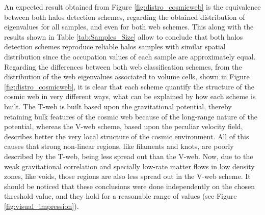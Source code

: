 \documentclass[a4,useAMS,usenatbib,usegraphicx]{latex/mn2e}
\begin{document}
An expected result obtained from Figure \ref{fig:distro_cosmicweb} is 
the equivalence between both halos detection schemes, regarding the 
obtained distribution of eigenvalues for all samples, and even for both 
web schemes. This along with the results shown in Table 
\ref{tab:Samples_Size} allow to conclude that both halos detection schemes 
reproduce reliable halos samples with similar spatial distribution since 
the occupation values of each sample are approximately equal. Regarding 
the differences between both web classification schemes, from the 
distribution of the web eigenvalues associated to volume cells, shown in 
Figure \ref{fig:distro_cosmicweb}, it is clear that each scheme quantify 
the structure of the cosmic web in very different ways, what can be 
explained by how each scheme is built. The T-web is built based upon the 
gravitational potential, thereby retaining bulk features of the cosmic web 
because of the long-range nature of the potential, whereas the V-web 
scheme, based upon the peculiar velocity field, describes better the very 
local structure of the cosmic environment. All of this causes that
strong non-linear regions, like filaments and knots, are poorly described 
by the T-web, being less spread out than the V-web. Now, due to the weak 
gravitational correlation and specially low-rate matter flows in low 
density zones, like voids, those regions are also less spread out in the 
V-web scheme. It should be noticed that these conclusions were done 
independently on the chosen threshold value, and they hold for a 
reasonable range of values (see Figure \ref{fig:visual_impression}).
\end{document}
